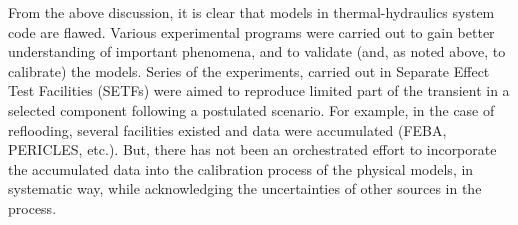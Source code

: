 \documentclass[11pt,titlepage]{article}
\begin{document}
From the above discussion, it is clear that models in thermal-hydraulics system code are flawed. 
Various experimental programs were carried out to gain better understanding of important phenomena, and to validate (and, as noted above, to calibrate) the models. 
Series of the experiments, carried out in Separate Effect Test Facilities (SETFs) were aimed to reproduce limited part of the transient in a selected component following a postulated scenario. 
For example, in the case of reflooding, several facilities existed and data were accumulated (FEBA, PERICLES, etc.). 
But, there has not been an orchestrated effort to incorporate the accumulated data into the calibration process of the physical models, in systematic way, while acknowledging the uncertainties of other sources in the process. 




\end{document}
